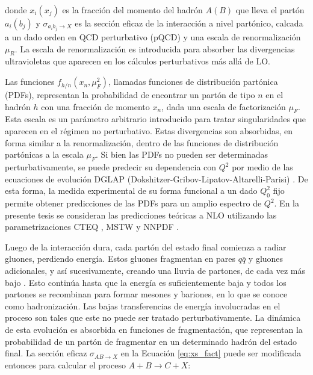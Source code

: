 donde $x_i(x_j)$ es la fracción del momento del hadrón $A(B)$ que lleva el partón $a_i(b_j)$ y $\sigma_{a_i b_j \to X}$ es la sección eficaz de la interacción a nivel partónico, calcada a un dado orden en QCD perturbativo (pQCD) y una escala de renormalización $\mu_R$. La escala de renormalización es introducida
para absorber las divergencias ultravioletas que aparecen en los cálculos perturbativos más
allá de LO.

Las funciones $f_{h/n}(x_{n}, \mu_{F}^2)$, llamadas funciones de distribución partónica (PDFs), representan la probabilidad de encontrar un partón de tipo $n$ en el hadrón $h$ con una fracción de
momento $x_n$, dada una escala de factorización $\mu_{F}$. Esta escala es un parámetro arbitrario
introducido para tratar singularidades que aparecen en el régimen no perturbativo. Estas
divergencias son absorbidas, en forma similar a la renormalización, dentro de las funciones
de distribución partónicas a la escala $\mu_F$. Si bien las PDFs no pueden ser determinadas
perturbativamente, se puede predecir su dependencia con $Q^2$ por medio de las ecuaciones
de evolución DGLAP (Dokshitzer-Gribov-Lipatov-Altarelli-Parisi) \cite{dis,lipatovparton,altarelli-parisi}. De esta forma, la
medida experimental de su forma funcional a un dado $Q^2_0$ fijo permite obtener predicciones
de las PDFs para un amplio espectro de $Q^2$. En la presente tesis se consideran las predicciones teóricas a NLO utilizando las parametrizaciones CTEQ \cite{cteq}, MSTW \cite{mstw1, mstw2, mstw3} y NNPDF \cite{nnpdf}.

Luego de la interacción dura, cada partón del estado final comienza a radiar gluones,
perdiendo energía. Estos gluones fragmentan en pares $q\bar{q}$ y gluones adicionales, y así sucesivamente, creando una lluvia de partones, de cada vez más bajo \pt. Esto continúa hasta
que la energía es suficientemente baja y todos los partones se recombinan para formar
mesones y bariones, en lo que se conoce como hadronización. Las bajas transferencias de
energía involucradas en el proceso son tales que este no puede ser tratado perturbativamente. La dinámica de esta evolución es absorbida en funciones de fragmentación, que
representan la probabilidad de un partón de fragmentar en un determinado hadrón del
estado final. La sección eficaz $\sigma_{AB\to X}$ en la Ecuación \ref{eq:xs_fact} puede ser modificada entonces para
calcular el proceso $A + B \to C + X$:


